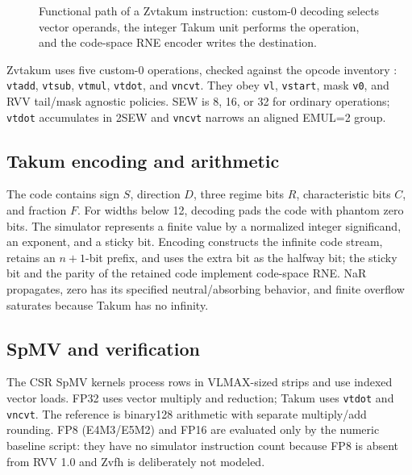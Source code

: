 \documentclass[conference]{IEEEtran}
\begin{document}
\begin{figure}[t]
\centering
{}
\caption{Functional path of a Zvtakum instruction: custom-0 decoding selects
vector operands, the integer Takum unit performs the operation, and the
code-space RNE encoder writes the destination.}
\label{fig:architecture}
\end{figure}

Zvtakum uses five custom-0 operations, checked against the opcode inventory
\cite{riscv-opcodes}: \texttt{vtadd}, \texttt{vtsub},
\texttt{vtmul}, \texttt{vtdot}, and \texttt{vncvt}. They obey \texttt{vl},
\texttt{vstart}, mask \texttt{v0}, and RVV tail/mask agnostic policies. SEW is
8, 16, or 32 for ordinary operations; \texttt{vtdot} accumulates in 2SEW and
\texttt{vncvt} narrows an aligned EMUL=2 group.

\subsection{Takum encoding and arithmetic}
The code contains sign $S$, direction $D$, three regime bits $R$, characteristic
bits $C$, and fraction $F$. For widths below 12, decoding pads the code with
phantom zero bits. The simulator represents a finite value by a normalized
integer significand, an exponent, and a sticky bit. Encoding constructs the
infinite code stream, retains an $n+1$-bit prefix, and uses the extra bit as
the halfway bit; the sticky bit and the parity of the retained code implement
code-space RNE. NaR propagates, zero has its specified neutral/absorbing
behavior, and finite overflow saturates because Takum has no infinity.

\subsection{SpMV and verification}
The CSR SpMV kernels process rows in VLMAX-sized strips and use indexed vector
loads. FP32 uses vector multiply and reduction; Takum uses \texttt{vtdot} and
\texttt{vncvt}. The reference is binary128 arithmetic with separate
multiply/add rounding. FP8 (E4M3/E5M2) and FP16 are evaluated only by the
numeric baseline script: they have no simulator instruction count because FP8
is absent from RVV 1.0 and Zvfh is deliberately not modeled.
\end{document}
